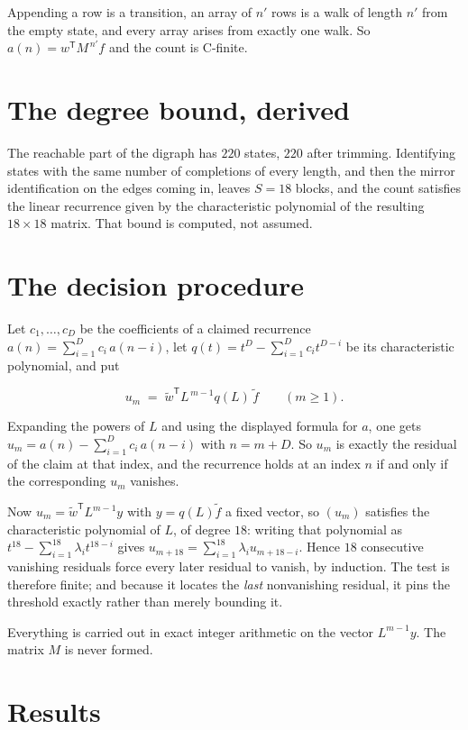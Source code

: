 \documentclass[11pt]{article}
\theoremstyle{definition}
\begin{document}
Appending a row is a transition, an array of $n'$ rows is a walk of length $n'$ from the empty state, and every array arises from exactly one walk. So $a(n) = w^{\mathsf T}M^{\,n'}f$ and the count is C-finite.

\section{The degree bound, derived}

The reachable part of the digraph has $220$ states, $220$ after trimming. Identifying states with the same number of completions of every length, and then the mirror identification on the edges coming in, leaves $S = 18$ blocks, and the count satisfies the linear recurrence given by the characteristic polynomial of the resulting $18\times18$ matrix. That bound is computed, not assumed.

\section{The decision procedure}

Let $c_1,\dots,c_D$ be the coefficients of a claimed recurrence $a(n) = \sum_{i=1}^{D} c_i\,a(n-i)$, let $q(t) = t^{D} - \sum_{i=1}^{D} c_i t^{D-i}$ be its characteristic polynomial, and put

\[u_m \;=\; \tilde w^{\mathsf T} L^{\,m-1} q(L)\,\tilde f \qquad (m \ge 1).\]

Expanding the powers of $L$ and using the displayed formula for $a$, one gets $u_m = a(n) - \sum_{i=1}^{D} c_i\,a(n-i)$ with $n = m + D$. So $u_m$ is exactly the residual of the claim at that index, and the recurrence holds at an index $n$ if and only if the corresponding $u_m$ vanishes.

Now $u_m = \tilde w^{\mathsf T} L^{m-1} y$ with $y = q(L)\tilde f$ a fixed vector, so $(u_m)$ satisfies the characteristic polynomial of $L$, of degree $18$: writing that polynomial as $t^{18} - \sum_{i=1}^{18} \lambda_i t^{18-i}$ gives $u_{m+18} = \sum_{i=1}^{18} \lambda_i u_{m+18-i}$. Hence $18$ consecutive vanishing residuals force every later residual to vanish, by induction. The test is therefore finite; and because it locates the {\itshape last} nonvanishing residual, it pins the threshold exactly rather than merely bounding it.

Everything is carried out in exact integer arithmetic on the vector $L^{m-1}y$. The matrix $M$ is never formed.

\section{Results}
\end{document}
